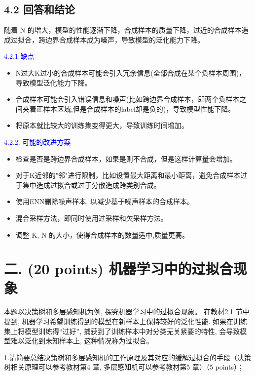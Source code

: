 \documentclass[8pt]{article}
\begin{document}
\subsection*{4.2 回答和结论}
随着 N 的增大，模型的性能逐渐下降，合成样本的质量下降，过近的合成样本造成过拟合，跨边界合成样本成为噪声，导致模型的泛化能力下降。

\textcolor{blue}{4.2.1 缺点}
    \begin{itemize}
        \item N过大K过小的合成样本可能会引入冗余信息(全部合成在某个负样本周围)，导致模型泛化能力下降。
        \item 合成样本可能会引入错误信息和噪声(比如跨边界合成样本，即两个负样本之间夹着正样本区域,但是合成样本的label却是负的)，导致模型性能下降。
        \item 将原本就比较大的训练集变得更大，导致训练时间增加。
    \end{itemize}

\textcolor{blue}{4.2.2. 可能的改进方案}
    \begin{itemize}
        \item 检查是否是跨边界合成样本，如果是则不合成，但是这样计算量会增加。
        \item 对于K近邻的"邻"进行限制，比如设置最大距离和最小距离，避免合成样本过于集中造成过拟合或过于分散造成跨类别合成。
        \item 使用ENN删除噪声样本, 以减少基于噪声样本的合成样本。
        \item 混合采样方法，即同时使用过采样和欠采样方法。
        \item 调整 K, N 的大小，使得合成样本的数量适中,质量更高。
    \end{itemize}

\vspace{3em}

\section*{二. (20 points) 机器学习中的过拟合现象}

本题以决策树和多层感知机为例, 探究机器学习中的过拟合现象。 在教材2.1 节中提到, 机器学习希望训练得到的模型在新样本上保持较好的泛化性能. 如果在训练集上将模型训练得“过好”, 捕获到了训练样本中对分类无关紧要的特性, 会导致模型难以泛化到未知样本上, 这种情况称为过拟合。

1.请简要总结决策树和多层感知机的工作原理及其对应的缓解过拟合的手段（决策树相关原理可以参考教材第4 章, 多层感知机可以参考教材第5 章）（5 points）；
\end{document}
